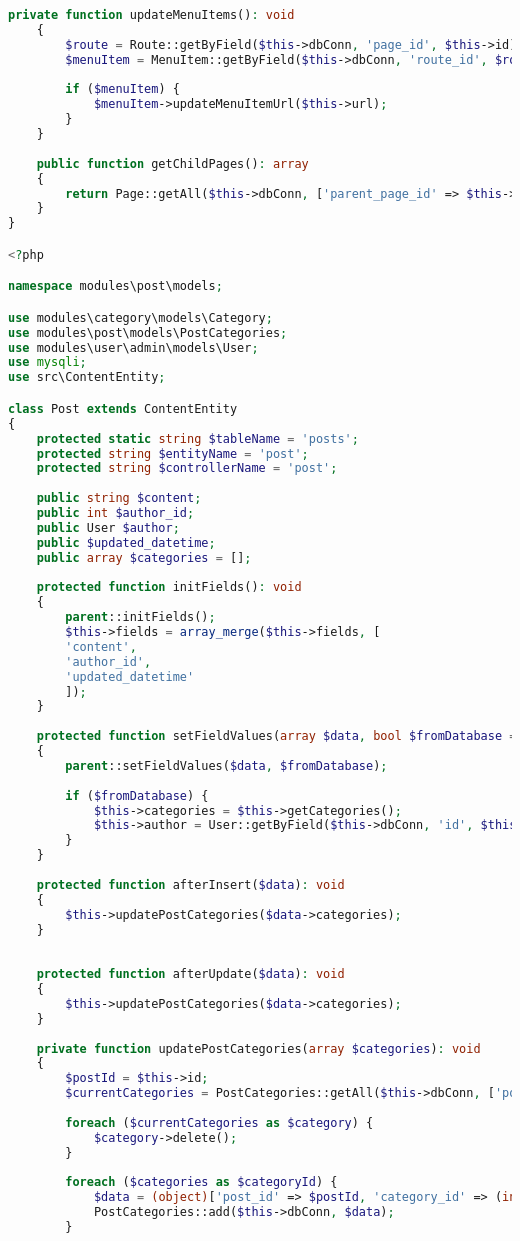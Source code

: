 \begin{lstlisting}[language=PHP, frame=none]
	private function updateMenuItems(): void
	{
		$route = Route::getByField($this->dbConn, 'page_id', $this->id);
		$menuItem = MenuItem::getByField($this->dbConn, 'route_id', $route->id);
		
		if ($menuItem) {
			$menuItem->updateMenuItemUrl($this->url);
		}
	}
	
	public function getChildPages(): array
	{
		return Page::getAll($this->dbConn, ['parent_page_id' => $this->id]);
	}
}

<?php

namespace modules\post\models;

use modules\category\models\Category;
use modules\post\models\PostCategories;
use modules\user\admin\models\User;
use mysqli;
use src\ContentEntity;

class Post extends ContentEntity
{
	protected static string $tableName = 'posts';
	protected string $entityName = 'post';
	protected string $controllerName = 'post';
	
	public string $content;
	public int $author_id;
	public User $author;
	public $updated_datetime;
	public array $categories = [];
	
	protected function initFields(): void
	{
		parent::initFields();
		$this->fields = array_merge($this->fields, [
		'content',
		'author_id',
		'updated_datetime'
		]);
	}
	
	protected function setFieldValues(array $data, bool $fromDatabase = false): void
	{
		parent::setFieldValues($data, $fromDatabase);
		
		if ($fromDatabase) {
			$this->categories = $this->getCategories();
			$this->author = User::getByField($this->dbConn, 'id', $this->author_id);
		}
	}
	
	protected function afterInsert($data): void
	{
		$this->updatePostCategories($data->categories);
	}
	
	
	protected function afterUpdate($data): void
	{
		$this->updatePostCategories($data->categories);
	}
	
	private function updatePostCategories(array $categories): void
	{
		$postId = $this->id;
		$currentCategories = PostCategories::getAll($this->dbConn, ['post_id' => $postId]);
		
		foreach ($currentCategories as $category) {
			$category->delete();
		}
		
		foreach ($categories as $categoryId) {
			$data = (object)['post_id' => $postId, 'category_id' => (int)$categoryId];
			PostCategories::add($this->dbConn, $data);
		}
		

\end{lstlisting}
